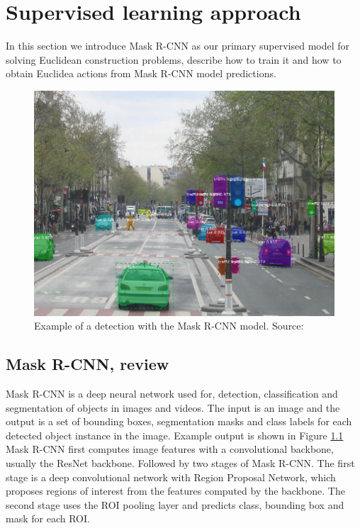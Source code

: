 \chapter{Supervised learning approach}
\label{mrcnn_chapter}
In this section we introduce Mask {R-CNN} \cite{DBLP:journals/corr/HeGDG17} as our primary supervised model for solving Euclidean construction problems, describe how to train it and how to obtain Euclidea actions from Mask {R-CNN} model predictions.

\begin{figure}[h]
\centering
\includegraphics[width=140mm]{img/mask_rcnn_example.png}
\caption{Example of a detection with the Mask {R-CNN} model. Source: \cite{matterport_maskrcnn_2017}}
\label{mrcnn_example}

\end{figure}


\section{Mask {R-CNN}, review}
Mask R-CNN is a deep neural network used for, detection, classification and segmentation of objects in images and videos. The input is an image and the output is a set of bounding boxes, segmentation masks and class labels for each detected object instance in the image. Example output is shown in Figure \ref{mrcnn_example}
\newline \newline
Mask {R-CNN} first computes image features with a convolutional backbone, usually the ResNet backbone. Followed by two stages of Mask {R-CNN}. The first stage is a deep convolutional network with Region Proposal Network, which proposes regions of interest from the features computed by the backbone. The second stage uses the ROI pooling layer and predicts class, bounding box and mask for each ROI.

